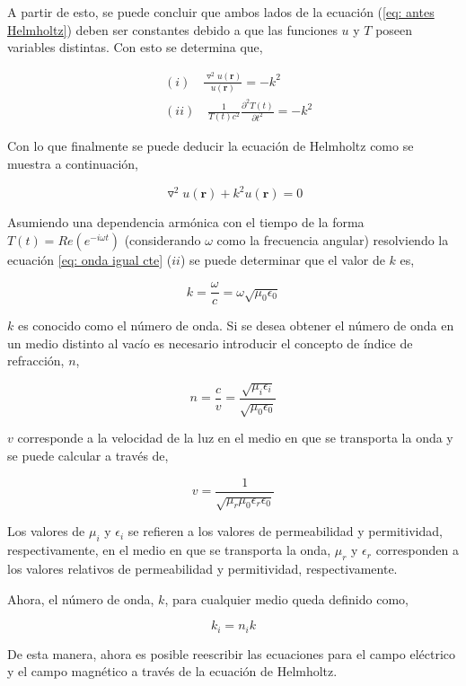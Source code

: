 \documentclass[12pt,letterpaper]{article}
\numberwithin{equation}{section}
\begin{document}
A partir de esto, se puede concluir que ambos lados de la ecuación (\ref{eq: antes Helmholtz}) deben ser constantes debido a que las funciones $u$ y $T$ poseen variables distintas. Con esto se determina que,

\begin{equation}
\begin{split}
	&(i)\quad\frac{\triangledown^2u(\textbf{r})}{u(\textbf{r})} = -k^2\\
    &(ii)\quad\frac{1}{T(t)c^2}\frac{\partial^2T(t)}{\partial t^2} = -k^2
\end{split}
\label{eq: onda igual cte}   
\end{equation} 

\pagebreak
Con lo que finalmente se puede deducir la ecuación de Helmholtz como se muestra a continuación,

\begin{equation}
\boxed{\triangledown^2u(\textbf{r})+k^2u(\textbf{r})=0}
\label{eq: ecuacion de helmholtz}
\end{equation}

Asumiendo una dependencia armónica con el tiempo de la forma $T(t) = Re(e^{-i\omega t})$ (considerando $\omega$ como la frecuencia angular) resolviendo la ecuación \ref{eq: onda igual cte} ($ii$) se puede determinar que el valor de $k$ es,

$$k=\frac{\omega}{c}=\omega\sqrt{\mu_0\epsilon_0}$$

$k$ es conocido como el número de onda. Si se desea obtener el número de onda en un medio distinto al vacío es necesario introducir el concepto de índice de refracción, $n$,

$$n = \frac{c}{v} = \frac{\sqrt{\mu_i\epsilon_i}}{\sqrt{\mu_0\epsilon_0}}$$

$v$ corresponde a la velocidad de la luz en el medio en que se transporta la onda y se puede calcular a través de,

$$v = \frac{1}{\sqrt{\mu_r\mu_0\epsilon_r\epsilon_0}}$$

Los valores de $\mu_i$ y $\epsilon_i$ se refieren a los valores de permeabilidad y permitividad, respectivamente, en el medio en que se transporta la onda, $\mu_r$ y $\epsilon_r$ corresponden a los valores relativos de permeabilidad y permitividad, respectivamente.

Ahora, el número de onda, $k$, para cualquier medio queda definido como,

$$k_i = n_i k$$

De esta manera, ahora es posible reescribir las ecuaciones para el campo eléctrico y el campo magnético a través de la ecuación de Helmholtz.
\end{document}
